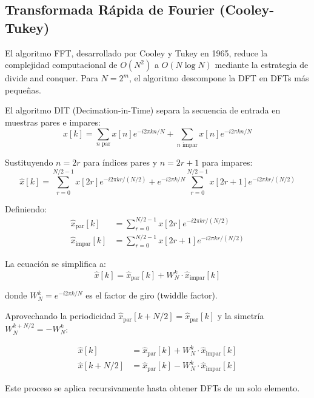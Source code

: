\documentclass[a4paper]{article}
\begin{document}
\subsection{Transformada Rápida de Fourier (Cooley-Tukey)}

El algoritmo FFT, desarrollado por Cooley y Tukey en 1965, reduce la complejidad computacional de $O(N^2)$ a $O(N \log N)$
mediante la estrategia de divide and conquer. Para $N = 2^m$, el algoritmo descompone la DFT en DFTs más pequeñas.

El algoritmo DIT (Decimation-in-Time) separa la secuencia de entrada en muestras pares e impares:
\begin{equation}
    \hat{x}[k] = \sum_{n \text{ par}} x[n] e^{-i2\pi kn/N} + \sum_{n \text{ impar}} x[n] e^{-i2\pi kn/N}
\end{equation}

Sustituyendo $n = 2r$ para índices pares y $n = 2r+1$ para impares:
\begin{equation}
    \hat{x}[k] = \sum_{r=0}^{N/2-1} x[2r] e^{-i2\pi kr/(N/2)} + e^{-i2\pi k/N} \sum_{r=0}^{N/2-1} x[2r+1] e^{-i2\pi kr/(N/2)}
\end{equation}

Definiendo:
\begin{align}
    \hat{x}_{\text{par}}[k]   & = \sum_{r=0}^{N/2-1} x[2r] e^{-i2\pi kr/(N/2)}   \\
    \hat{x}_{\text{impar}}[k] & = \sum_{r=0}^{N/2-1} x[2r+1] e^{-i2\pi kr/(N/2)}
\end{align}

La ecuación se simplifica a:
\begin{equation}
    \hat{x}[k] = \hat{x}_{\text{par}}[k] + W_N^k \cdot \hat{x}_{\text{impar}}[k]
\end{equation}

donde $W_N^k = e^{-i2\pi k/N}$ es el factor de giro (twiddle factor).

Aprovechando la periodicidad $\hat{x}_{\text{par}}[k + N/2] = \hat{x}_{\text{par}}[k]$ y la simetría $W_N^{k+N/2} = -W_N^k$:

\begin{align}
    \hat{x}[k]       & = \hat{x}_{\text{par}}[k] + W_N^k \cdot \hat{x}_{\text{impar}}[k] \\
    \hat{x}[k + N/2] & = \hat{x}_{\text{par}}[k] - W_N^k \cdot \hat{x}_{\text{impar}}[k]
\end{align}

Este proceso se aplica recursivamente hasta obtener DFTs de un solo elemento.
\end{document}
